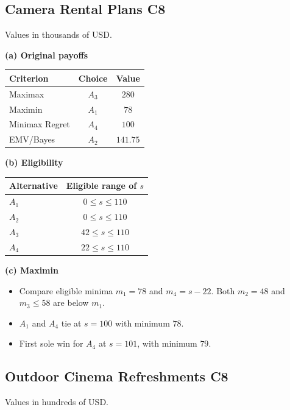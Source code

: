 {\small
\subsection{Camera Rental Plans \hfill C8}
\noindent Values in thousands of USD.

\noindent\begin{minipage}[t]{0.35\textwidth}
  \vspace{0pt}
  \textbf{(a) Original payoffs}\par\smallskip
  \setlength{\tabcolsep}{3pt}
  \begin{tabular}{@{}lcc@{}}
    \toprule
    Criterion & Choice & Value\\ \midrule
    Maximax & $A_3$ & $280$\\
    Maximin & $A_1$ & $78$\\
    Minimax Regret & $A_4$ & $100$\\
    EMV/Bayes & $A_2$ & $141.75$\\
    \bottomrule
  \end{tabular}
\end{minipage}\hfill
\begin{minipage}[t]{0.62\textwidth}
  \vspace{0pt}
  \textbf{(b) Eligibility}\par\smallskip
  \begin{tabular}{@{}lc@{}}
    \toprule
    Alternative & Eligible range of $s$\\ \midrule
    $A_1$ & $0\le s\le110$\\
    $A_2$ & $0\le s\le110$\\
    $A_3$ & $42\le s\le110$\\
    $A_4$ & $22\le s\le110$\\
    \bottomrule
  \end{tabular}\par\smallskip
  \textbf{(c) Maximin}
  \begin{itemize}[leftmargin=*,nosep]
    \item Compare eligible minima $m_1=78$ and $m_4=s-22$. Both $m_2=48$ and $m_3\le58$ are below $m_1$.
    \item $A_1$ and $A_4$ tie at $s=100$ with minimum $78$.
    \item First sole win for $A_4$ at $\boxed{s=101}$, with minimum $79$.
  \end{itemize}
\end{minipage}

\subsection{Outdoor Cinema Refreshments \hfill C8}
\noindent Values in hundreds of USD.

}
